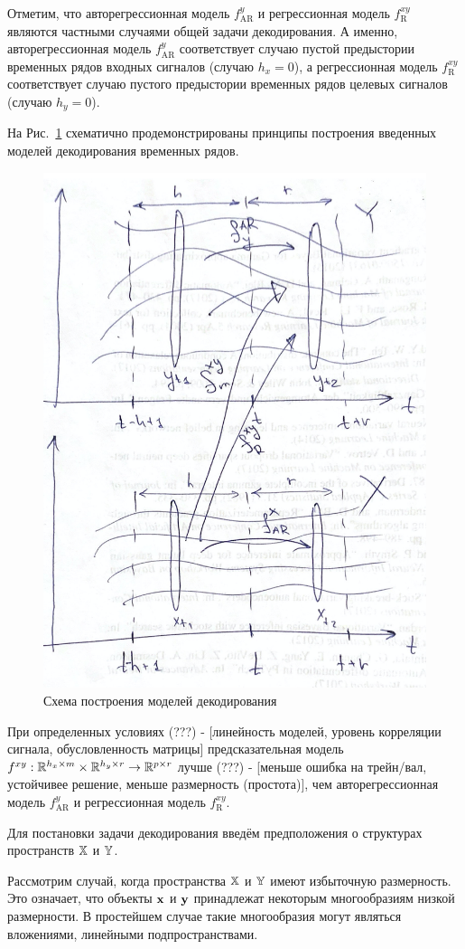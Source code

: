 Отметим, что авторегрессионная модель $f_{\text{AR}}^y$ и регрессионная модель $f_{\text{R}}^{xy}$ являются частными случаями общей задачи декодирования. А именно, авторегрессионная модель $f_{\text{AR}}^y$ соответствует случаю пустой предыстории временных рядов входных сигналов (случаю $h_x = 0$), а регрессионная модель $f_{\text{R}}^{xy}$ соответствует случаю пустого предыстории временных рядов целевых сигналов (случаю $h_y = 0$).

На Рис.~\ref{ch2:time_series_decoding} схематично продемонстрированы принципы построения введенных моделей декодирования временных рядов.

\begin{figure}
	\centering
	\includegraphics[width=0.5\linewidth]{figs/ch2/time_series_decoding}
	\caption{Схема построения моделей декодирования}
	\label{ch2:time_series_decoding}
\end{figure}

\begin{theorem}
	При определенных условиях (???) - [линейность моделей, уровень корреляции сигнала, обусловленность матрицы] предсказательная модель $f^{xy}: \mathbb{R}^{h_x \times m} \times \mathbb{R}^{h_y \times r} \rightarrow \mathbb{R}^{p \times r}$ лучше (???) - [меньше ошибка на трейн/вал, устойчивее решение, меньше размерность (простота)], чем авторегрессионная модель $f_{\text{AR}}^y$ и регрессионная модель $f_{\text{R}}^{xy}$.
\end{theorem}

\hrulefill

Для постановки задачи декодирования введём предположения о структурах пространств $\mathbb{X}$ и $\mathbb{Y}$.
\begin{assumption}
	Рассмотрим случай, когда пространства $\mathbb{X}$ и $\mathbb{Y}$ имеют избыточную размерность. 
	Это означает, что объекты $\mathbf{x}$ и $\mathbf{y}$ принадлежат некоторым многообразиям низкой размерности. В простейшем случае такие многообразия могут являться вложениями, линейными подпространствами.
\end{assumption}


